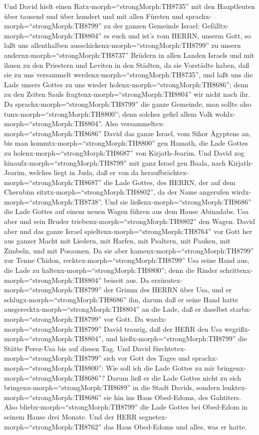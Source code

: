  Und David hielt einen Ratx-morph=``strongMorph:TH8735'' mit
den Hauptleuten über tausend und über hundert und mit allen Fürsten
 und sprachx-morph=``strongMorph:TH8799'' zu der ganzen
Gemeinde Israel: Gefälltx-morph=``strongMorph:TH8804'' es euch und ist's
vom HERRN, unserm Gott, so laßt uns allenthalben
ausschickenx-morph=``strongMorph:TH8799'' zu unsern
andernx-morph=``strongMorph:TH8737'' Brüdern in allen Landen Israels und
mit ihnen zu den Priestern und Leviten in den Städten, da sie Vorstädte
haben, daß sie zu uns versammelt werdenx-morph=``strongMorph:TH8735'',
 und laßt uns die Lade unsers Gottes zu uns wieder
holenx-morph=``strongMorph:TH8686''; denn zu den Zeiten Sauls
fragtenx-morph=``strongMorph:TH8804'' wir nicht nach ihr. 
Da sprachx-morph=``strongMorph:TH8799'' die ganze Gemeinde, man sollte
also tunx-morph=``strongMorph:TH8800''; denn solches gefiel allem Volk
wohlx-morph=``strongMorph:TH8804''.  Also
versammeltex-morph=``strongMorph:TH8686'' David das ganze Israel, vom
Sihor Ägyptens an, bis man kommtx-morph=``strongMorph:TH8800'' gen
Hamath, die Lade Gottes zu holenx-morph=``strongMorph:TH8687'' von
Kirjath-Jearim.  Und David zog
hinaufx-morph=``strongMorph:TH8799'' mit ganz Israel gen Baala, nach
Kirjath-Jearim, welches liegt in Juda, daß er von da
heraufbrächtex-morph=``strongMorph:TH8687'' die Lade Gottes, des HERRN,
der auf dem Cherubim sitztx-morph=``strongMorph:TH8802'', da der Name
angerufen wirdx-morph=``strongMorph:TH8738''.  Und sie
ließenx-morph=``strongMorph:TH8686'' die Lade Gottes auf einem neuen
Wagen führen aus dem Hause Abinadabs. Usa aber und sein Bruder
triebenx-morph=``strongMorph:TH8802'' den Wagen.  David aber
und das ganze Israel spieltenx-morph=``strongMorph:TH8764'' vor Gott her
aus ganzer Macht mit Liedern, mit Harfen, mit Psaltern, mit Pauken, mit
Zimbeln, und mit Posaunen.  Da sie aber
kamenx-morph=``strongMorph:TH8799'' zur Tenne Chidon,
recktex-morph=``strongMorph:TH8799'' Usa seine Hand aus, die Lade zu
haltenx-morph=``strongMorph:TH8800''; denn die Rinder
schrittenx-morph=``strongMorph:TH8804'' beiseit aus.  Da
erzürntex-morph=``strongMorph:TH8799'' der Grimm des HERRN über Usa, und
er schlugx-morph=``strongMorph:TH8686'' ihn, darum daß er seine Hand
hatte ausgerecktx-morph=``strongMorph:TH8804'' an die Lade, daß er
daselbst starbx-morph=``strongMorph:TH8799'' vor Gott.  Da
wardx-morph=``strongMorph:TH8799'' David traurig, daß der HERR den Usa
wegrißx-morph=``strongMorph:TH8804'', und
hießx-morph=``strongMorph:TH8799'' die Stätte Perez-Usa bis auf diesen
Tag.  Und David fürchtetex-morph=``strongMorph:TH8799''
sich vor Gott des Tages und sprachx-morph=``strongMorph:TH8800'': Wie
soll ich die Lade Gottes zu mir bringenx-morph=``strongMorph:TH8686''?
 Darum ließ er die Lade Gottes nicht zu sich
bringenx-morph=``strongMorph:TH8689'' in die Stadt Davids, sondern
lenktex-morph=``strongMorph:TH8686'' sie hin ins Haus Obed-Edoms, des
Gahtiters.  Also bliebx-morph=``strongMorph:TH8799'' die
Lade Gottes bei Obed-Edom in seinem Hause drei Monate. Und der HERR
segnetex-morph=``strongMorph:TH8762'' das Haus Obed-Edoms und alles, was
er hatte.

